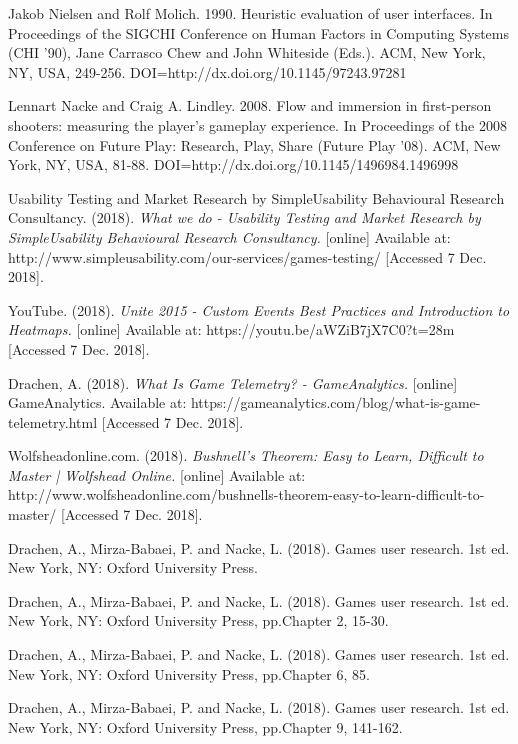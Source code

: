 \documentclass[journal]{IEEEtran}
\begin{document}
\begin{thebibliography}{1}
Jakob Nielsen and Rolf Molich. 1990. Heuristic evaluation of user interfaces. In Proceedings of the SIGCHI Conference on Human Factors in Computing Systems (CHI '90), Jane Carrasco Chew and John Whiteside (Eds.). ACM, New York, NY, USA, 249-256. DOI=http://dx.doi.org/10.1145/97243.97281

Lennart Nacke and Craig A. Lindley. 2008. Flow and immersion in first-person shooters: measuring the player's gameplay experience. In Proceedings of the 2008 Conference on Future Play: Research, Play, Share (Future Play '08). ACM, New York, NY, USA, 81-88. DOI=http://dx.doi.org/10.1145/1496984.1496998

Usability Testing and Market Research by SimpleUsability Behavioural Research Consultancy. (2018). \emph{What we do - Usability Testing and Market Research by SimpleUsability Behavioural Research Consultancy.} [online] Available at: http://www.simpleusability.com/our-services/games-testing/ [Accessed 7 Dec. 2018].

YouTube. (2018). \emph{Unite 2015 - Custom Events Best Practices and Introduction to Heatmaps.} [online] Available at: https://youtu.be/aWZiB7jX7C0?t=28m [Accessed 7 Dec. 2018].

Drachen, A. (2018). \emph{What Is Game Telemetry? - GameAnalytics.} [online] GameAnalytics. Available at: https://gameanalytics.com/blog/what-is-game-telemetry.html [Accessed 7 Dec. 2018].

Wolfsheadonline.com. (2018). \emph{Bushnell's Theorem: Easy to Learn, Difficult to Master | Wolfshead Online.} [online] Available at: http://www.wolfsheadonline.com/bushnells-theorem-easy-to-learn-difficult-to-master/ [Accessed 7 Dec. 2018].

Drachen, A., Mirza-Babaei, P. and Nacke, L. (2018). Games user research. 1st ed. New York, NY: Oxford University Press.

Drachen, A., Mirza-Babaei, P. and Nacke, L. (2018). Games user research. 1st ed. New York, NY: Oxford University Press, pp.Chapter 2, 15-30.

Drachen, A., Mirza-Babaei, P. and Nacke, L. (2018). Games user research. 1st ed. New York, NY: Oxford University Press, pp.Chapter 6, 85.

Drachen, A., Mirza-Babaei, P. and Nacke, L. (2018). Games user research. 1st ed. New York, NY: Oxford University Press, pp.Chapter 9, 141-162.


\end{thebibliography}
\end{document}
